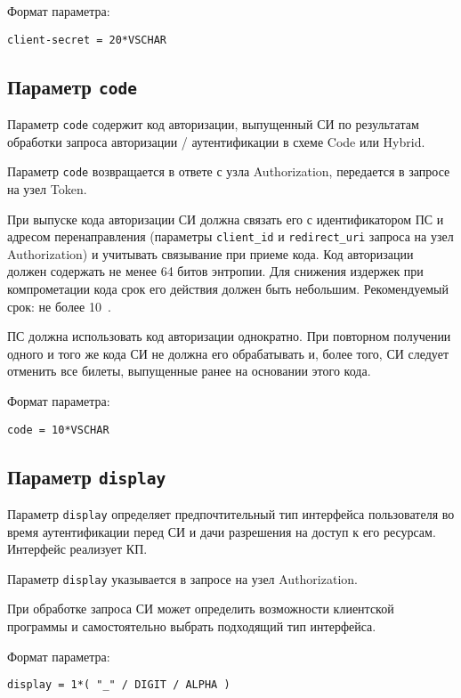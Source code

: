 Формат параметра:
\begin{lstlisting}
client-secret = 20*VSCHAR
\end{lstlisting}

\subsection{Параметр \lstinline{code}}\label{PARAMS.Code}

Параметр \lstinline{code} содержит код авторизации, выпущенный СИ
по результатам обработки запроса авторизации / аутентификации в схеме
Code или Hybrid.

Параметр \lstinline{code} возвращается в ответе с узла Authorization, 
передается в запросе на узел Token.

При выпуске кода авторизации СИ должна связать его с идентификатором ПС 
и адресом перенаправления (параметры \lstinline{client_id} и 
\lstinline{redirect_uri} запроса на узел Authorization) и учитывать 
связывание при приеме кода.
%
Код авторизации должен содержать не менее 64 битов энтропии.
%
Для снижения издержек при компрометации кода срок его действия должен быть 
небольшим.
%
Рекомендуемый срок: не более 10~.

ПС должна использовать код авторизации однократно. При повторном получении 
одного и того же кода СИ не должна его обрабатывать и, более того, СИ следует   
отменить все билеты, выпущенные ранее на основании этого кода.

Формат параметра:
\begin{lstlisting}
code = 10*VSCHAR
\end{lstlisting}

\subsection{Параметр \lstinline{display}}\label{PARAMS.Display}  

Параметр \lstinline{display} определяет предпочтительный тип интерфейса 
пользователя во время аутентификации перед СИ и дачи разрешения на доступ к его 
ресурсам. Интерфейс реализует КП.

Параметр \lstinline{display} указывается в запросе на узел Authorization.

При обработке запроса СИ может определить возможности клиентской программы и 
самостоятельно выбрать подходящий тип интерфейса.

Формат параметра:
\begin{lstlisting}
display = 1*( "_" / DIGIT / ALPHA )
\end{lstlisting}

